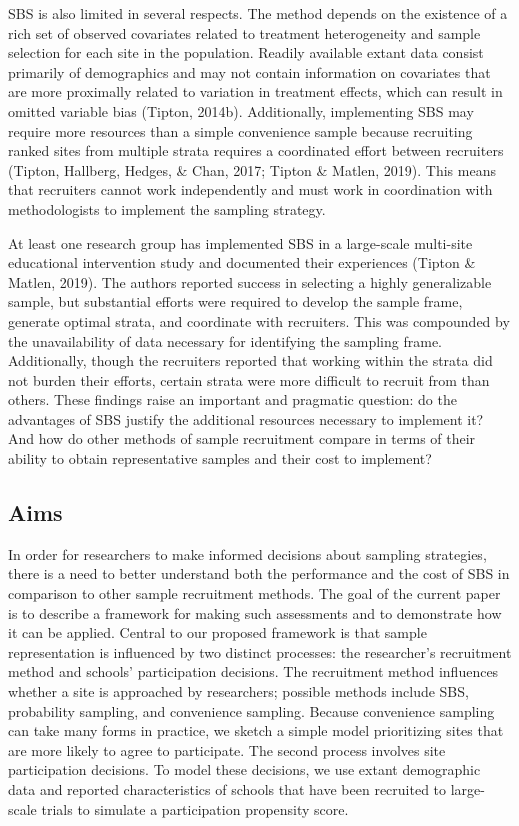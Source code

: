 \documentclass[
  english,
  man,floatsintext]{apa6}
\begin{document}
SBS is also limited in several respects. The method depends on the existence of a rich set of observed covariates related to treatment heterogeneity and sample selection for each site in the population. Readily available extant data consist primarily of demographics and may not contain information on covariates that are more proximally related to variation in treatment effects, which can result in omitted variable bias (Tipton, 2014b). Additionally, implementing SBS may require more resources than a simple convenience sample because recruiting ranked sites from multiple strata requires a coordinated effort between recruiters (Tipton, Hallberg, Hedges, \& Chan, 2017; Tipton \& Matlen, 2019). This means that recruiters cannot work independently and must work in coordination with methodologists to implement the sampling strategy.

At least one research group has implemented SBS in a large-scale multi-site educational intervention study and documented their experiences (Tipton \& Matlen, 2019). The authors reported success in selecting a highly generalizable sample, but substantial efforts were required to develop the sample frame, generate optimal strata, and coordinate with recruiters.
This was compounded by the unavailability of data necessary for identifying the sampling frame.
Additionally, though the recruiters reported that working within the strata did not burden their efforts, certain strata were more difficult to recruit from than others.
These findings raise an important and pragmatic question: do the advantages of SBS justify the additional resources necessary to implement it?
And how do other methods of sample recruitment compare in terms of their ability to obtain representative samples and their cost to implement?

\hypertarget{aims}{%
\subsection{Aims}\label{aims}}

In order for researchers to make informed decisions about sampling strategies, there is a need to better understand both the performance and the cost of SBS in comparison to other sample recruitment methods.
The goal of the current paper is to describe a framework for making such assessments and to demonstrate how it can be applied.
Central to our proposed framework is that sample representation is influenced by two distinct processes: the researcher's recruitment method and schools' participation decisions.
The recruitment method influences whether a site is approached by researchers; possible methods include SBS, probability sampling, and convenience sampling.
Because convenience sampling can take many forms in practice, we sketch a simple model prioritizing sites that are more likely to agree to participate.
The second process involves site participation decisions.
To model these decisions, we use extant demographic data and reported characteristics of schools that have been recruited to large-scale trials to simulate a participation propensity score.
\end{document}
